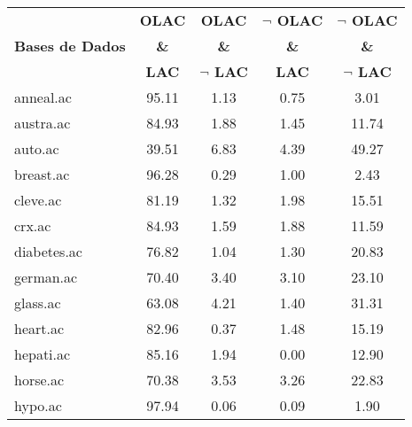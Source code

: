 \begin{table}[htbp]
	\centering
		\renewcommand{\tabcolsep}{1.8mm}
		\begin{tabular}{|l|c|c|c|c|}
		\hline
				& \textbf{OLAC}		& \textbf{OLAC}			& \textbf{$\neg$ OLAC}	& \textbf{$\neg$ OLAC}	\\
		\textbf{Bases de Dados}	& \textbf{\&}		& \textbf{\&}			& \textbf{\&}			& \textbf{\&}			\\
				& \textbf{LAC}		& \textbf{$\neg$ LAC}		& \textbf{LAC}			& \textbf{$\neg$ LAC}		\\
		\hline
		anneal.ac       & 95.11         & 1.13               & 0.75                     & 3.01                          \\
		\hline
		austra.ac       & 84.93         & 1.88               & 1.45                     & 11.74                         \\
		\hline
		auto.ac         & 39.51         & 6.83               & 4.39                     & 49.27                         \\
		\hline
		breast.ac       & 96.28         & 0.29               & 1.00                     & 2.43                          \\
		\hline
		cleve.ac        & 81.19         & 1.32               & 1.98                     & 15.51                         \\
		\hline
		crx.ac          & 84.93         & 1.59               & 1.88                     & 11.59                         \\
		\hline
		diabetes.ac     & 76.82         & 1.04               & 1.30                     & 20.83                         \\
		\hline
		german.ac       & 70.40         & 3.40               & 3.10                     & 23.10                         \\
		\hline
		glass.ac        & 63.08         & 4.21               & 1.40                     & 31.31                         \\
		\hline
		heart.ac        & 82.96         & 0.37               & 1.48                     & 15.19                         \\
		\hline
		hepati.ac       & 85.16         & 1.94               & 0.00                     & 12.90                         \\
		\hline
		horse.ac        & 70.38         & 3.53               & 3.26                     & 22.83                         \\
		\hline
		hypo.ac         & 97.94         & 0.06               & 0.09                     & 1.90                          \\

\end{tabular}
\end{table}
